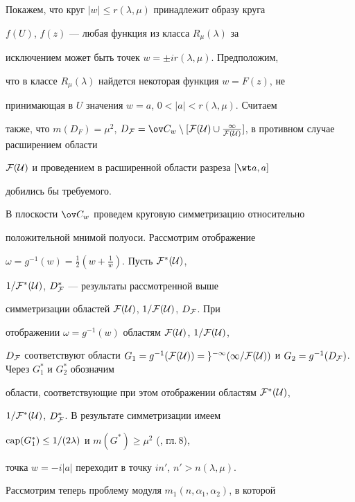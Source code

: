 \begin{pf} 


Покажем, что круг $|w|\le r(\lambda,\mu)$ принадлежит образу круга 


$f(U)$, $f(z)$ --- любая функция из класса $R_\mu(\lambda)$ за 


исключением может быть точек $w=\pm ir(\lambda,\mu)$. Предположим, 


что в классе $R_\mu(\lambda)$ найдется некоторая функция $w=F(z)$, не 


принимающая в $U$ значения $w=a$, $0<|a|<r(\lambda,\mu)$. Считаем 


также, что $m(D_F)=\mu^2$, $D_{\cal F}=\ov C_w\setminus[\cal 


F(U)\cup\frac{1}{\cal F(U)}]$, в противном случае расширением области 


$\cal F(U)$ и проведением в расширенной области разреза $[\wt a,a]$ 


добились бы требуемого. 


 


В плоскости $\ov C_w$ проведем круговую симметризацию относительно 


положительной мнимой полуоси. Рассмотрим отображение 


$\omega=g^{-1}(w)=\frac{1}{2}(w+\frac{1}{w})$. Пусть $\cal F^*(U)$, 


$1/\cal F^*(U)$, $D_{\cal F}^*$ --- результаты рассмотренной выше 


симметризации областей $\cal F(U)$, $1/\cal F(U)$, $D_{\cal F}$. При 


отображении $\omega=g^{-1}(w)$ областям $\cal F(U)$, $1/\cal F(U)$, 


$D_{\cal F}$ соответствуют области $G_1=g^{-1}(\cal F(U))=g^{-1}(1/\cal 


F(U))$ и $G_2=g^{-1}(D_{\cal F})$. Через $G^*_1$ и $G^*_2$ обозначим 


области, соответствующие при этом отображении областям $\cal F^*(U)$, 


$1/\cal F^*(U)$, $D^*_{\cal F}$. В результате симметризации имеем 


$\operatorname{cap}(G^*_1)\le1/(2\lambda)$ и $m(G^*)\ge\mu^2$ (\cite{1}, гл.\,8), 


точка $w=-i|a|$ переходит в точку $in'$, $n'>n(\lambda,\mu)$. 


 


Рассмотрим теперь проблему модуля $m_1(n,\alpha_1,\alpha_2)$, в которой 



\end{pf}
